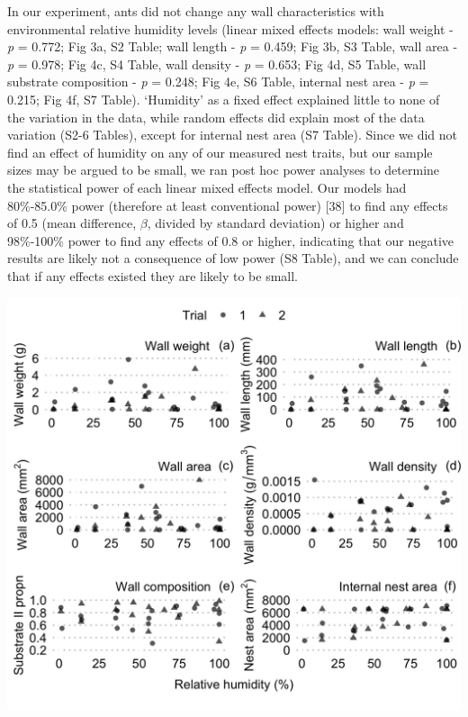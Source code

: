 \documentclass[3p]{elsarticle} %
\begin{document}
In our experiment, ants did not change any wall characteristics with
environmental relative humidity levels (linear mixed effects models:
wall weight - \emph{p} = 0.772; Fig 3a, S2 Table; wall length - \emph{p}
= 0.459; Fig 3b, S3 Table, wall area - \emph{p} = 0.978; Fig 4c, S4
Table, wall density - \emph{p} = 0.653; Fig 4d, S5 Table, wall substrate
composition - \emph{p} = 0.248; Fig 4e, S6 Table, internal nest area -
\emph{p} = 0.215; Fig 4f, S7 Table). `Humidity' as a fixed effect
explained little to none of the variation in the data, while random
effects did explain most of the data variation (S2-6 Tables), except for
internal nest area (S7 Table). Since we did not find an effect of
humidity on any of our measured nest traits, but our sample sizes may be
argued to be small, we ran post hoc power analyses to determine the
statistical power of each linear mixed effects model. Our models had
80\%-85.0\% power (therefore at least conventional power) {[}38{]} to
find any effects of 0.5 (mean difference, \(\beta\), divided by standard
deviation) or higher and 98\%-100\% power to find any effects of 0.8 or
higher, indicating that our negative results are likely not a
consequence of low power (S8 Table), and we can conclude that if any
effects existed they are likely to be small.

\begin{flushleft}\includegraphics[width=1\linewidth,height=0.75\textheight]{../figures/Fig3} \end{flushleft}
\end{document}
